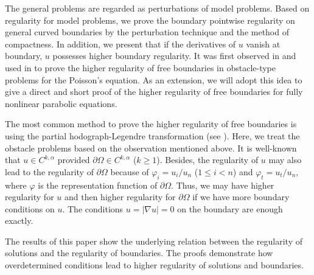 \documentclass[preprint,12pt]{elsarticle}
\theoremstyle{definition}
\theoremstyle{remark}
\numberwithin{equation}{section}
\begin{document}
The general problems are regarded as perturbations of model problems. Based on regularity for model problems, we prove the boundary pointwise regularity on general curved boundaries by the perturbation technique and the method of compactness. In addition, we present that if the derivatives of $u$ vanish at boundary, $u$ possesses higher boundary regularity. It was first observed in \cite{MR4088470} and used in \cite{freeboundary} to prove the higher regularity of free boundaries in obstacle-type problems for the Poisson's equation. As an extension, we will adopt this idea to give a direct and short proof of the higher regularity of free boundaries for fully nonlinear parabolic equations.

The most common method to prove the higher regularity of free boundaries is using the partial hodograph-Legendre transformation (see \cite{MR440187,MR0478079}). Here, we treat the obstacle problems based on the observation mentioned above. It is well-known that $u\in C^{k,\alpha}$ provided $\partial \Omega\in C^{k,\alpha}$ ($k\geq 1$). Besides, the regularity of $u$ may also lead to the regularity of $\partial \Omega$ because of $\varphi_i=u_i/u_n$ ($1\leq i< n$) and $\varphi_t=u_t/u_n$, where $\varphi$ is the representation function of $\partial \Omega$. Thus, we may have higher regularity for $u$ and then higher regularity for $\partial \Omega$ if we have more boundary conditions on $u$. The conditions $u=|\nabla u|=0$ on the boundary are enough exactly.

The results of this paper show the underlying relation between the regularity of solutions and the regularity of boundaries. The proofs demonstrate how overdetermined conditions lead to higher regularity of solutions and boundaries.
\end{document}
